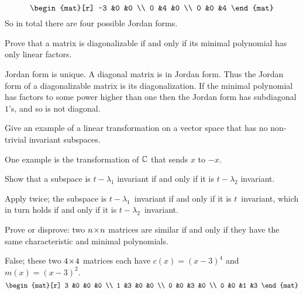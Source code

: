 \begin{exercises}
\begin{answer}
\begin{equation*}
\begin{mat}[r]
          -3  &0  &0  \\
           0  &4  &0  \\
           0  &0  &4
        \end{mat}
     \end{equation*}  
     So in total there are four possible Jordan forms.
    \end{answer}
  \recommended \item
    Prove that a matrix is diagonalizable if and only if its minimal
    polynomial has only linear factors.
    \begin{answer}
       Jordan form is unique.
       A diagonal matrix is in Jordan form.
       Thus the Jordan form of a diagonalizable matrix is its diagonalization.
       If the minimal polynomial has factors to some power higher than one
       then the Jordan form has subdiagonal \( 1 \)'s, and so is not
       diagonal.  
     \end{answer}
  \item 
    Give an example of a linear transformation on a vector
    space that has no non-trivial invariant subspaces.
    \begin{answer}
      One example is the transformation of \( \mathbb{C} \) that
       sends \( x \) to \( -x \).  
     \end{answer}
  \item 
    Show that a subspace is \( t-\lambda_1 \) invariant if and only if
    it is \( t-\lambda_2 \) invariant.
    \begin{answer}
      Apply  twice;
      the subspace is $t-\lambda_1$~invariant if and only if it is 
      $t$~invariant, which in turn holds if and only if it is 
      $t-\lambda_2$~invariant.  
    \end{answer}
  \item 
     Prove or disprove: two \( n \! \times \! n \) matrices are
     similar if and only if they have the same characteristic and
     minimal polynomials.
     \begin{answer}
       False; these two $4 \! \times \! 4$ matrices each have $c(x)=(x-3)^4$
       and $m(x)=(x-3)^2$.
       \begin{equation*}
          \begin{mat}[r]
             3  &0  &0  &0  \\
             1  &3  &0  &0  \\
             0  &0  &3  &0  \\
             0  &0  &1  &3
          \end{mat}

\end{equation*}
\end{answer}
\end{exercises}
